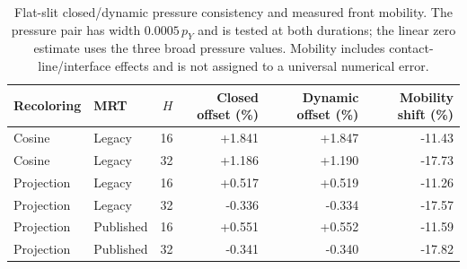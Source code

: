 \begin{table}[htbp]\centering\small
\caption{Flat-slit closed/dynamic pressure consistency and measured front mobility. The pressure pair has width $0.0005\,p_Y$ and is tested at both durations; the linear zero estimate uses the three broad pressure values. Mobility includes contact-line/interface effects and is not assigned to a universal numerical error.}
\begin{tabular}{llrrrr}\toprule
Recoloring & MRT & $H$ & Closed offset (\%) & Dynamic offset (\%) & Mobility shift (\%) \\ \midrule
Cosine & Legacy & 16 & +1.841 & +1.847 & -11.43 \\
Cosine & Legacy & 32 & +1.186 & +1.190 & -17.73 \\
Projection & Legacy & 16 & +0.517 & +0.519 & -11.26 \\
Projection & Legacy & 32 & -0.336 & -0.334 & -17.57 \\
Projection & Published & 16 & +0.551 & +0.552 & -11.59 \\
Projection & Published & 32 & -0.341 & -0.340 & -17.82 \\
\bottomrule\end{tabular}\end{table}
